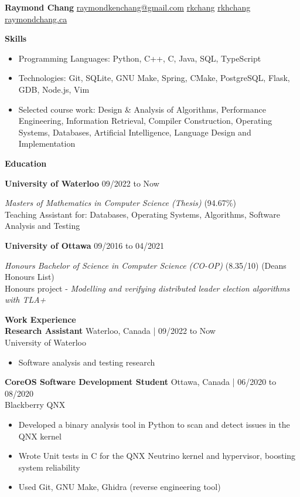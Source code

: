 \documentclass[10pt]{article}
\begin{document}
{\huge\textbf{Raymond Chang}} \space\space
{} \href{mailto:raymondkenchang@gmail.com}{raymondkenchang@gmail.com}  \space\space
{} \href{https://github.com/rkchang}{rkchang} \space\space
{} \href{https://linkedin.com/in/rkhchang}{rkhchang} \space\space
{} \href{https://raymondchang.ca/}{raymondchang.ca}

\bigskip

{\Large\textbf{Skills}}\space \hrulefill
\begin{itemize}
    \item Programming Languages: Python, C++, C, Java, SQL, TypeScript
    \item Technologies: Git, SQLite, GNU Make, Spring, CMake, PostgreSQL, Flask, GDB, Node.js, Vim
    \item Selected course work: Design \& Analysis of Algorithms, Performance Engineering, Information Retrieval, Compiler Construction, Operating Systems, Databases, Artificial Intelligence, Language Design and Implementation
\end{itemize}

\smallskip

{\Large\textbf{Education}}\space \hrulefill

\textbf{University of Waterloo} \hfill  09/2022 to Now

\textit{Masters of Mathematics in Computer Science (Thesis)} (94.67\%) \\
Teaching Assistant for: Databases, Operating Systems, Algorithms, Software Analysis and Testing

\textbf{University of Ottawa} \hfill 09/2016 to 04/2021

\textit{Honours Bachelor of Science in Computer Science (CO-OP)} (8.35/10) (Deans Honours List) \\ 
Honours project - \textit{Modelling and verifying distributed leader election algorithms with TLA+}

\smallskip

{\Large\textbf{Work Experience}}\space \hrulefill \\
\textbf{Research Assistant} \hfill Waterloo, Canada | 09/2022 to Now \\
University of Waterloo
\begin{itemize}
    \item Software analysis and testing research 
\end{itemize}

\textbf{CoreOS Software Development Student} \hfill Ottawa, Canada | 06/2020 to 08/2020 \\
Blackberry QNX
\begin{itemize}
    \item Developed a binary analysis tool in Python to scan and detect issues in the QNX kernel
    \item Wrote Unit tests in C for the QNX Neutrino kernel and hypervisor, boosting system reliability
    \item Used Git, GNU Make, Ghidra (reverse engineering tool)
\end{itemize}
\end{document}
